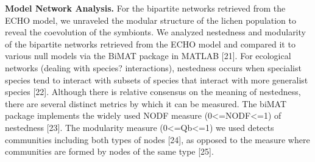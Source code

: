 \textbf{Model Network Analysis.} 
For the bipartite networks retrieved from the ECHO model, we unraveled the modular structure of the lichen population to reveal the coevolution of the symbionts. We analyzed nestedness and modularity of the bipartite networks retrieved from the ECHO model and compared it to various null models via the BiMAT package in MATLAB [21]. For ecological networks (dealing with species? interactions), nestedness occurs when specialist species tend to interact with subsets of species that interact with more generalist species [22]. Although there is relative consensus on the meaning of nestedness, there are several distinct metrics by which it can be measured. The biMAT package implements the widely used NODF measure (0<=NODF<=1) of nestedness [23]. The modularity measure (0<=Qb<=1) we used detects communities including both types of nodes [24], as opposed to the measure where communities are formed by nodes of the same type [25]. 


